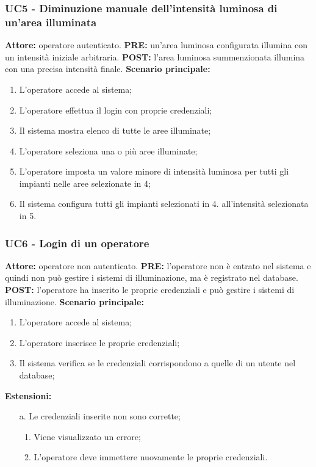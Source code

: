 \documentclass[a4paper, 12pt]{article}
\begin{document}
\subsubsection{UC5 - Diminuzione manuale dell'intensità luminosa di un'area illuminata}
\textbf{Attore:} operatore autenticato.\newline
\textbf{PRE:} un'area luminosa configurata illumina con un intensità iniziale arbitraria.\newline
\textbf{POST:} l'area luminosa summenzionata illumina con una precisa intensità finale.\newline
\textbf{Scenario principale:}
\begin{enumerate}
    \item L'operatore accede al sistema;
    \item L'operatore effettua il login con proprie credenziali;
    \item Il sistema mostra elenco di tutte le aree illuminate;
    \item L'operatore seleziona una o più aree illuminate;
    \item L'operatore imposta un valore minore di intensità luminosa per tutti gli impianti nelle aree selezionate in 4;
    \item Il sistema configura tutti gli impianti selezionati in 4. all'intensità selezionata in 5.
\end{enumerate}

\subsubsection{UC6 - Login di un operatore}
\textbf{Attore:} operatore non autenticato.\newline
\textbf{PRE:} l'operatore non è entrato nel sistema e quindi non può gestire i sistemi di illuminazione, ma è registrato nel database.\newline
\textbf{POST:} l'operatore ha inserito le proprie credenziali e può gestire i sistemi di illuminazione.\newline
\textbf{Scenario principale:}
\begin{enumerate}
    \item L'operatore accede al sistema;
    \item L'operatore inserisce le proprie credenziali;
    \item Il sistema verifica se le credenziali corrispondono a quelle di un utente nel database;
\end{enumerate}
\textbf{Estensioni:}
\begin{itemize}
    \item [a.] Le credenziali inserite non sono corrette;
    \begin{enumerate}
        \item Viene visualizzato un errore;
        \item L'operatore deve immettere nuovamente le proprie credenziali.
    \end{enumerate}
\end{itemize}
\end{document}
